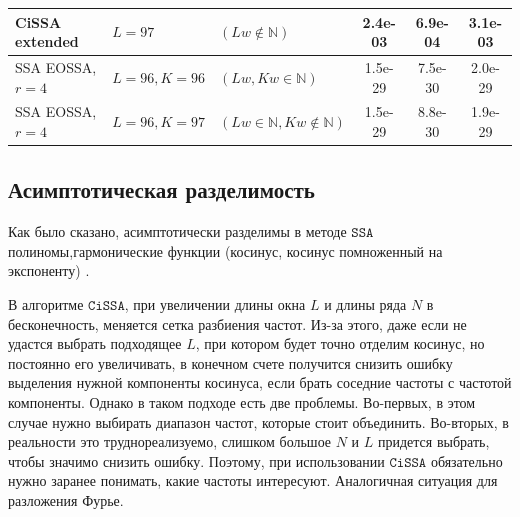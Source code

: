 \documentclass[12pt, specialist, subf
]{disser}
\theoremstyle{definition}
\newcommand{\SSA}{\texttt{SSA}}
\newcommand{\CISSA}{\texttt{CiSSA}}
\begin{document}
\begin{table}[H]
\begin{tabular}{l|ll|ccc}
		CiSSA extended     &
		$L = 97  $         & $ (Lw \not \in \mathbb{N})$                   & 2.4e-03 & 6.9e-04                          & 3.1e-03                                                      \\
		\hline
		SSA EOSSA, $r = 4$ &
		$L = 96, K = 96  $ & $ (Lw, Kw \in \mathbb{N})$                    & 1.5e-29 & 7.5e-30                          & 2.0e-29                                                      \\
		SSA EOSSA, $r = 4$ &
		$L = 96, K = 97  $ & $ (Lw \in \mathbb{N}, Kw \not\in \mathbb{N})$ & 1.5e-29 & 8.8e-30                          & 1.9e-29                                                      \\
		\hline
	\end{tabular}
	\label{tab:precise_separability_example1}
\end{table}








\subsection{Асимптотическая разделимость}
\label{subsubsec:asymp}
Как было сказано, асимптотически разделимы в методе $\SSA$ полиномы,гармонические функции (косинус, косинус помноженный на экспоненту) \cite{golyandina2001analysis}.

В алгоритме $\CISSA$, при увеличении длины окна $L$ и длины ряда $N$ в бесконечность, меняется сетка разбиения частот. Из-за этого, даже если не удастся выбрать подходящее $L$, при котором будет точно отделим косинус, но постоянно его увеличивать, в конечном счете получится снизить ошибку выделения нужной компоненты косинуса, если брать соседние частоты с частотой компоненты. Однако в таком подходе есть две проблемы. Во-первых, в этом случае нужно выбирать диапазон частот, которые стоит объединить. Во-вторых, в реальности это труднореализуемо, слишком большое $N$ и $L$ придется выбрать, чтобы значимо снизить ошибку. Поэтому, при использовании $\CISSA$ обязательно нужно заранее понимать, какие частоты интересуют. Аналогичная ситуация для разложения Фурье.
\end{document}

